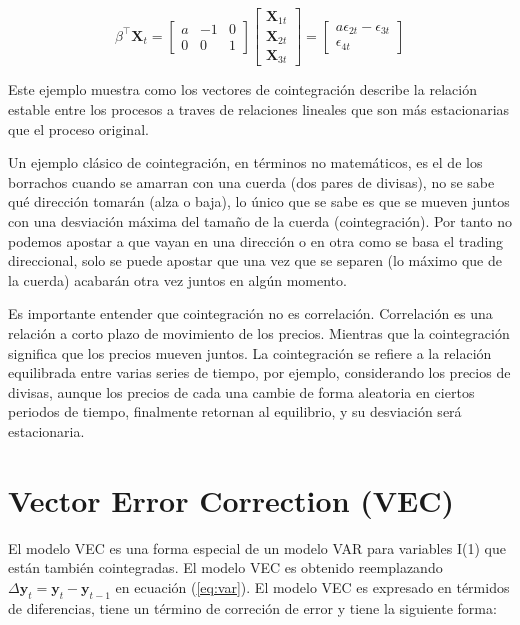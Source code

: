 \[
\beta^\intercal \mathbf{X}_t = 
\begin{bmatrix}
a & -1 & 0 \\
0 & 0 & 1
\end{bmatrix} 
\begin{bmatrix} 
\mathbf{X}_{1t} \\
\mathbf{X}_{2t} \\
\mathbf{X}_{3t}
\end{bmatrix} = 
\begin{bmatrix}
a\epsilon_{2t} - \epsilon_{3t} \\
\epsilon_{4t}
\end{bmatrix}
\]

Este ejemplo muestra como los vectores de cointegración describe la relación
estable entre los procesos a traves de relaciones lineales que son más
estacionarias que el proceso original.

Un ejemplo clásico de cointegración, en términos no matemáticos, es el de los
borrachos cuando se amarran con una cuerda (dos pares de divisas), no se sabe
qué  dirección tomarán (alza o baja), lo único que se sabe es que se mueven
juntos con una desviación máxima del tamaño de la cuerda (cointegración).  Por
tanto no podemos apostar a que vayan en una dirección o en otra como se basa el
trading direccional, solo se puede apostar que una vez que se separen (lo
máximo que de la cuerda) acabarán otra vez juntos en algún momento.

Es importante entender que cointegración no es correlación. Correlación es una
relación a corto plazo de movimiento de los precios. Mientras que la
cointegración significa que los precios mueven juntos. La cointegración se
refiere a la relación equilibrada entre varias series de tiempo, por ejemplo,
considerando los precios de divisas, aunque los precios de cada una cambie de
forma aleatoria en ciertos periodos de tiempo, finalmente retornan al
equilibrio, y su desviación será estacionaria.

\section{Vector Error Correction (VEC)}

El modelo VEC es una forma especial de un modelo VAR para variables I(1) que
están también cointegradas. El modelo VEC es obtenido reemplazando
$\Delta \mathbf{y}_t = \mathbf{y}_t - \mathbf{y}_{t-1}$ en ecuación
(\ref{eq:var}). El modelo VEC es expresado en térmidos de diferencias,
tiene un término de correción de error y tiene la siguiente forma:

